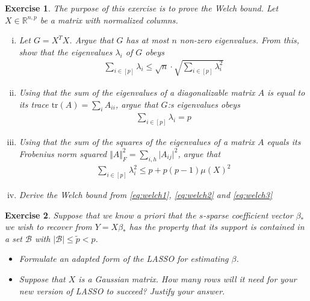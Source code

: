\documentclass{article}
\newcommand{\tr}{\mathrm{tr}}
\newcommand{\R}{\mathbb{R}}
\newtheorem{exercise}{Exercise}
\newcommand{\abs}[1]{\vert #1 \vert}
\newcommand{\norm}[1]{\Vert #1 \Vert}
\begin{document}
\begin{exercise}
    The purpose of this exercise is to prove the Welch bound. Let $X \in \R^{n,p}$ be a matrix with normalized columns.
    \begin{enumerate}[(i)]
        \item Let $G= X^TX$. Argue that $G$ has at most $n$ non-zero eigenvalues. From this, show that the eigenvalues $\lambda_i$ of $G$ obeys
        \begin{align}
            \sum_{i \in [p]} \lambda_i \leq \sqrt{n} \cdot \sqrt{\sum_{i \in [p]} \lambda_i^2} \label{eq:welch1}
        \end{align}
        \item Using that the sum of the eigenvalues of a diagonalizable matrix $A$ is equal to its trace $\tr(A) = \sum_i A_{ii}$, argue that $G$:s eigenvalues obeys
        \begin{align}
            \sum_{i \in [p]} \lambda_i = p \label{eq:welch2}
        \end{align}
        \item Using that the sum of the squares of the eigenvalues of a matrix $A$ equals its Frobenius norm squared $\norm{A}_F^2= \sum_{i,h} \abs{A_{ij}}^2$, argue that
        \begin{align}
            \sum_{i \in [p]} \lambda_i^2 \leq p + p(p-1)\mu(X)^2 \label{eq:welch3}
        \end{align}
        \item Derive the Welch bound from \eqref{eq:welch1}, \eqref{eq:welch2} and \eqref{eq:welch3}
    \end{enumerate}
\end{exercise}

\begin{exercise}
    Suppose that we know a priori that the $s$-sparse coefficient vector $\beta_*$ we wish to recover from $Y=X\beta_*$ has the property that its support is contained in a set $\mathcal{B}$ with $\abs{\mathcal{B}}\leq \tilde{p}<p$.
    \begin{itemize}
        \item Formulate an adapted form of the LASSO for estimating $\beta$.
        \item Suppose that $X$ is a Gaussian matrix. How many rows will it need for your new version of LASSO to succeed? Justify your answer.
    \end{itemize}
\end{exercise}
\end{document}

